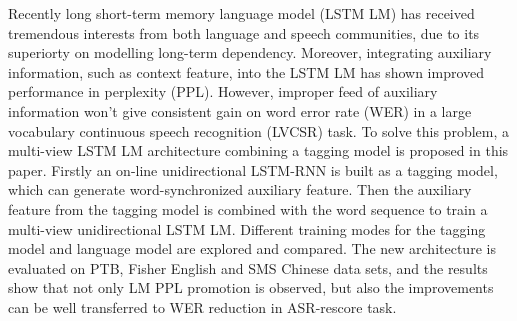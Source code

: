 \begin{bigabstract}
Recently long short-term memory language model (LSTM LM) has received tremendous interests from both language and speech communities, due to its superiorty on modelling long-term dependency. Moreover, integrating auxiliary information, such as context feature, into the LSTM LM has shown improved performance in perplexity (PPL). However, improper feed of auxiliary information won't give consistent gain on word error rate (WER) in a large vocabulary continuous speech recognition (LVCSR) task. To solve this problem, a multi-view LSTM LM architecture combining a tagging model is proposed in this paper. Firstly an on-line unidirectional LSTM-RNN is built as a tagging model, which can generate word-synchronized auxiliary feature. Then the auxiliary feature from the tagging model is combined with the word sequence to train a multi-view unidirectional LSTM LM. Different training modes for the tagging model and language model are explored and compared. The new architecture is evaluated on PTB, Fisher English and SMS Chinese data sets, and the results show that not only LM PPL promotion is observed, but also the improvements can be well transferred to WER reduction in ASR-rescore task.

\end{bigabstract}
